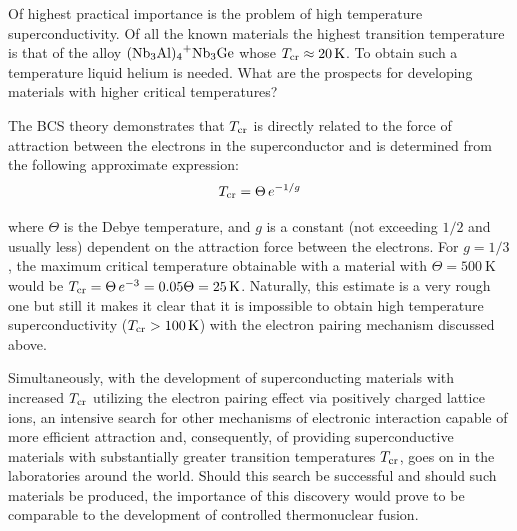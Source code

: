 Of highest practical importance is the problem of high temperature superconductivity. Of all the known materials the highest transition temperature is that of the alloy $\ce{(Nb3Al)4+Nb3Ge}$ whose $T_{\text{cr}}\approx\SI{20}{\kelvin}$. To obtain such a temperature liquid helium is needed. What are the prospects for developing materials with higher critical temperatures?

The BCS theory demonstrates that $T_{\text{cr}}$ is directly related to the force of attraction between the electrons in the superconductor and is determined from the following approximate expression:
\begin{equation}\label{eq:6_61}
	T_{\text{cr}} = \Theta\, e^{-1/g}
\end{equation}

\noindent
where $\Theta$ is the Debye temperature, and $g$ is a constant (not exceeding $1/2$ and usually less) dependent on the attraction force between the electrons. For $g=1/3$, the maximum critical temperature obtainable with a material with $\Theta=\SI{500}{\kelvin}$ would be $T_{\text{cr}}=\Theta\,e^{-3}=0.05\Theta=\SI{25}{\kelvin}$. Naturally, this estimate is a very rough one but still it makes it clear that it is impossible to obtain high temperature superconductivity ($T_{\text{cr}}>\SI{100}{\kelvin}$) with the electron pairing mechanism discussed above.

Simultaneously, with the development of superconducting materials with increased $T_{\text{cr}}$ utilizing the electron pairing effect via positively charged lattice ions, an intensive search for other mechanisms of electronic interaction capable of more efficient attraction and, consequently, of providing superconductive materials with substantially greater transition temperatures $T_{\text{cr}}$, goes on in the laboratories around the world. Should this search be successful and should such materials be produced, the importance of this discovery would prove to be comparable to the development of controlled thermonuclear fusion.
